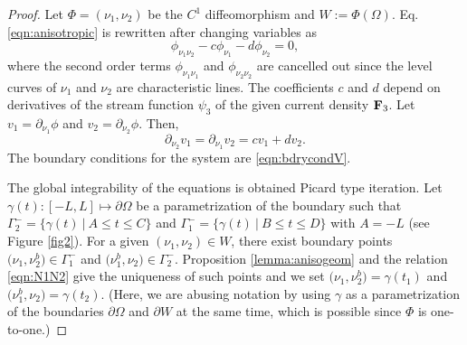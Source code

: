 \documentclass[11pt]{amsart}
\theoremstyle{plain}
\numberwithin{equation}{section}
\numberwithin{Thm}{section}
\def\F{{\bf F}}
\begin{document}
\begin{proof}
Let $\Phi =(\nu_1,\nu_2)$ be the $C^1$ diffeomorphism and $W:=\Phi(\Omega)$. Eq. \eqref{eqn:anisotropic} is rewritten after changing variables as
  \begin{equation}
  \phi_{\nu_1\nu_2} - c\phi_{\nu_1} - d\phi_{\nu_2} = 0,
  \end{equation}
where the second order terms $\phi_{\nu_1\nu_1}$ and $\phi_{\nu_2\nu_2}$ are cancelled out since the level curves of $\nu_1$ and $\nu_2$ are characteristic lines. The coefficients $c$ and $d$ depend on derivatives of the stream function $\psi_3$ of the given current density $\F_3$. Let $v_1 = \partial_{\nu_1}\phi$ and $v_2 = \partial_{\nu_2}\phi$. Then,
\begin{equation} \label{eqn:v}
\partial_{\nu_2}v_1 = \partial_{\nu_1} v_2 =cv_1 + dv_2 .
  \end{equation}
The boundary conditions for the system are \eqref{eqn:bdrycondV}.

The global integrability of the equations is obtained Picard type iteration. Let $\gamma(t) : [-L,L] \mapsto \partial \Omega$ be a parametrization of the boundary such that $\Gamma_2^-=\{\gamma(t) ~|~ A\le t\le C\}$ and $\Gamma_1^-=\{\gamma(t) ~|~ B\le t\le D\}$ with $A=-L$ (see Figure \ref{fig2}).  For a given $(\nu_1, \nu_2)\in W$, there exist boundary points $\big(\nu_1, \nu_2^b\big)\in \Gamma_1^-$ and $\big(\nu_1^b,\nu_2\big)\in \Gamma_2^-$. Proposition \ref{lemma:anisogeom} and the relation \eqref{eqn:N1N2} give the uniqueness of such points and we set $\big(\nu_1,\nu_2^b\big)=\gamma(t_1)$ and $\big(\nu_1^b,\nu_2\big)=\gamma(t_2)$. (Here, we are abusing notation by using $\gamma$ as a parametrization of the boundaries $\partial\Omega$ and $\partial W$ at the same time, which is possible since $\Phi$ is one-to-one.)


\end{proof}
\end{document}
